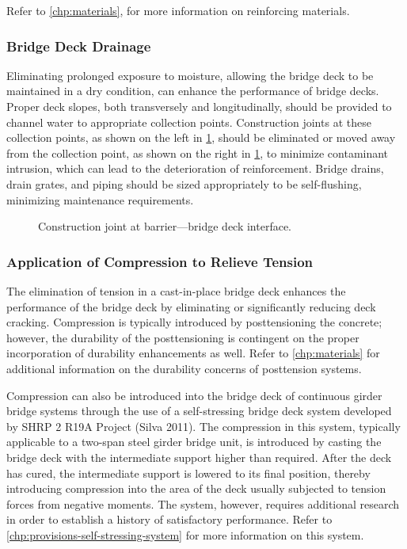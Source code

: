 Refer to \cref{chp:materials}, for more information on reinforcing materials.

\subsubsection{Bridge Deck Drainage}
Eliminating prolonged exposure to moisture, allowing the bridge deck to be maintained in a dry condition, can enhance the performance of bridge decks. Proper deck slopes, both transversely and longitudinally, should be provided to channel water to appropriate collection points. Construction joints at these collection points, as shown on the left in \cref{fig:joint-barrier}, should be eliminated or moved away from the collection point, as shown on the right in \cref{fig:joint-barrier}, to minimize contaminant intrusion, which can lead to the deterioration of reinforcement. Bridge drains, drain grates, and piping should be sized appropriately to be self-flushing, minimizing maintenance requirements.

\begin{figure}
  \caption{Construction joint at barrier—bridge deck interface.}
  \label{fig:joint-barrier}
\end{figure}

\subsubsection{Application of Compression to Relieve Tension}
The elimination of tension in a cast-in-place bridge deck enhances the performance of the bridge deck by
eliminating or significantly reducing deck cracking. Compression is typically introduced by posttensioning the
concrete; however, the durability of the posttensioning is contingent on the proper incorporation of durability
enhancements as well. Refer to \cref{chp:materials} for additional information on the durability concerns of posttension
systems.

Compression can also be introduced into the bridge deck of continuous girder bridge systems through the use of a self-stressing bridge deck system developed by SHRP 2 R19A Project (Silva 2011). The compression in this system, typically applicable to a two-span steel girder bridge unit, is introduced by casting the bridge deck with the intermediate support higher than required. After the deck has cured, the intermediate support is lowered to its final position, thereby introducing compression into the area of the deck usually subjected to tension forces from negative moments. The system, however, requires additional research in order to establish a history of satisfactory performance. Refer to \cref{chp:provisions-self-stressing-system} for more information on this system.

